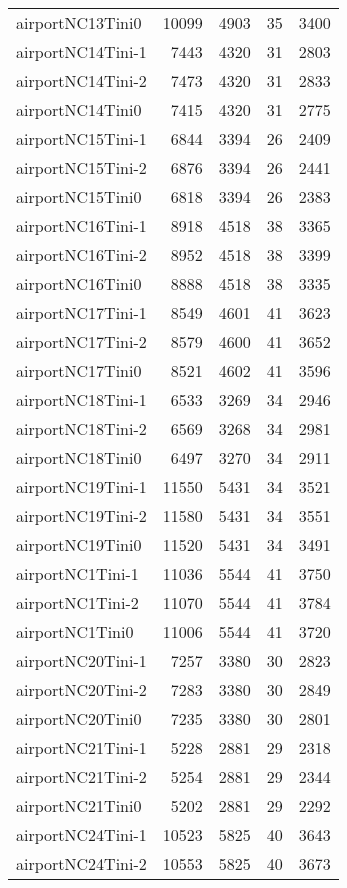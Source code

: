 \documentclass[../../../thesis.tex]{subfiles}
\begin{document}
\begin{longtable}{lrrrr}
airportNC13Tini0 & 10099 & 4903 & 35 & 3400 \\
airportNC14Tini-1 & 7443 & 4320 & 31 & 2803 \\
airportNC14Tini-2 & 7473 & 4320 & 31 & 2833 \\
airportNC14Tini0 & 7415 & 4320 & 31 & 2775 \\
airportNC15Tini-1 & 6844 & 3394 & 26 & 2409 \\
airportNC15Tini-2 & 6876 & 3394 & 26 & 2441 \\
airportNC15Tini0 & 6818 & 3394 & 26 & 2383 \\
airportNC16Tini-1 & 8918 & 4518 & 38 & 3365 \\
airportNC16Tini-2 & 8952 & 4518 & 38 & 3399 \\
airportNC16Tini0 & 8888 & 4518 & 38 & 3335 \\
airportNC17Tini-1 & 8549 & 4601 & 41 & 3623 \\
airportNC17Tini-2 & 8579 & 4600 & 41 & 3652 \\
airportNC17Tini0 & 8521 & 4602 & 41 & 3596 \\
airportNC18Tini-1 & 6533 & 3269 & 34 & 2946 \\
airportNC18Tini-2 & 6569 & 3268 & 34 & 2981 \\
airportNC18Tini0 & 6497 & 3270 & 34 & 2911 \\
airportNC19Tini-1 & 11550 & 5431 & 34 & 3521 \\
airportNC19Tini-2 & 11580 & 5431 & 34 & 3551 \\
airportNC19Tini0 & 11520 & 5431 & 34 & 3491 \\
airportNC1Tini-1 & 11036 & 5544 & 41 & 3750 \\
airportNC1Tini-2 & 11070 & 5544 & 41 & 3784 \\
airportNC1Tini0 & 11006 & 5544 & 41 & 3720 \\
airportNC20Tini-1 & 7257 & 3380 & 30 & 2823 \\
airportNC20Tini-2 & 7283 & 3380 & 30 & 2849 \\
airportNC20Tini0 & 7235 & 3380 & 30 & 2801 \\
airportNC21Tini-1 & 5228 & 2881 & 29 & 2318 \\
airportNC21Tini-2 & 5254 & 2881 & 29 & 2344 \\
airportNC21Tini0 & 5202 & 2881 & 29 & 2292 \\
airportNC24Tini-1 & 10523 & 5825 & 40 & 3643 \\
airportNC24Tini-2 & 10553 & 5825 & 40 & 3673 \\

\end{longtable}
\end{document}
